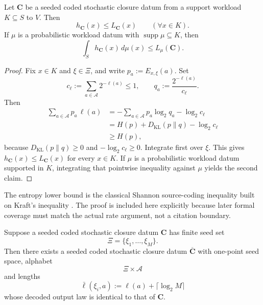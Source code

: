 \begin{theorem}
\label{thm:entropy-lower-bound}
Let \(\mathbf C\) be a seeded coded stochastic closure datum from a support
workload \(K\subseteq S\) to \(V\). Then
\[
h_{\mathbf C}(x)\le L_{\mathbf C}(x)
\qquad (\forall x\in K).
\]
If \(\mu\) is a probabilistic workload datum with
\(\operatorname{supp}\mu\subseteq K\), then
\[
\int_S h_{\mathbf C}(x)\,d\mu(x)\le L_{\mu}(\mathbf C).
\]
\end{theorem}

\begin{proof}
Fix \(x\in K\) and \(\xi\in\Xi\), and write \(p_a:=E_{x,\xi}(a)\). Set
\[
c_{\ell}:=\sum_{a\in\mathcal A}2^{-\ell(a)}\le 1,
\qquad
q_a:=\frac{2^{-\ell(a)}}{c_{\ell}}.
\]
Then
\begin{align*}
\sum_{a\in\mathcal A} p_a\,\ell(a)
&=
-\sum_{a\in\mathcal A} p_a \log_2 q_a-\log_2 c_{\ell} \\
&=
H(p)+D_{\mathrm{KL}}(p\|q)-\log_2 c_{\ell} \\
&\ge H(p),
\end{align*}
because \(D_{\mathrm{KL}}(p\|q)\ge 0\) and \(-\log_2 c_{\ell}\ge 0\). Integrate
first over \(\xi\). This gives \(h_{\mathbf C}(x)\le L_{\mathbf C}(x)\) for
every \(x\in K\). If \(\mu\) is a probabilistic workload datum supported in
\(K\), integrating that pointwise inequality against \(\mu\) yields the second
claim.
\end{proof}

\begin{remark}
\label{rem:stochastic-coding-origin}
The entropy lower bound is the classical Shannon source-coding inequality built
on Kraft's inequality \cite{Shannon1948,Kraft1949}. The proof is included here
explicitly because later formal coverage must match the actual rate argument,
not a citation boundary.
\end{remark}

\begin{theorem}
\label{thm:finite-seed-charging}
Suppose a seeded coded stochastic closure datum \(\mathbf C\) has finite seed
set
\[
\Xi=\{\xi_1,\dots,\xi_M\}.
\]
Then there exists a seeded coded stochastic closure datum
\(\overline{\mathbf C}\) with one-point seed space, alphabet
\[
\Xi\times\mathcal A
\]
and lengths
\[
\bar\ell(\xi_i,a):=\ell(a)+\lceil \log_2 M\rceil
\]
whose decoded output law is identical to that of \(\mathbf C\).
\end{theorem}

